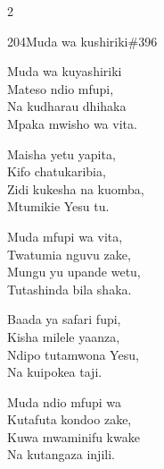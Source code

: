 \documentclass{article}
\begin{document}
\begin{multicols}{2}
\begin{hymn}{204}{Muda wa kushiriki}{\#396}
\begin{stanza}
Muda wa kuyashiriki\\
Mateso ndio mfupi,\\
Na kudharau dhihaka\\
Mpaka mwisho wa vita.
\end{stanza}
\begin{chorus}
Maisha yetu yapita,\\
Kifo chatukaribia,\\
Zidi kukesha na kuomba,\\
Mtumikie Yesu tu.
\end{chorus}
\begin{stanza}
Muda mfupi wa vita,\\
Twatumia nguvu zake,\\
Mungu yu upande wetu,\\
Tutashinda bila shaka.
\end{stanza}
\begin{stanza}
Baada ya safari fupi,\\
Kisha milele yaanza,\\
Ndipo tutamwona Yesu,\\
Na kuipokea taji.
\end{stanza}
\begin{stanza}
Muda ndio mfupi wa\\
Kutafuta kondoo zake,\\
Kuwa mwaminifu kwake\\
Na kutangaza injili.
\end{stanza}
\end{hymn}


\end{multicols}
\end{document}
